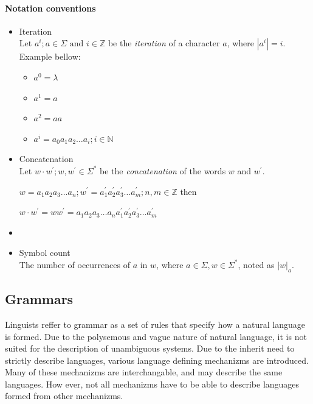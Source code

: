 \paragraph*{Notation conventions}



\begin{itemize}
\item Iteration\\
  Let $a^i; a \in \Sigma \text{ and } i \in \mathbb{Z}$ be the \emph{iteration} of a character $a$, where $|a^i| = i$.\\
Example bellow:


\begin{itemize}
\item $a^0 = \lambda$
\item $a^1 = a$
\item $a^2 = aa$
\item $a^i = a_0 a_1 a_2 \dots a_i; i \in \mathbb{N}$
\end{itemize}



\item Concatenation\\
  Let $w \cdot w^{'}; w, w^{'} \in \Sigma^{*}$ be the \emph{concatenation} of the words $w$ and $w^{'}$.

$w = a_1 a_2 a_3 \dots a_n ; w^{'} = a^{'}_1 a^{'}_2 a^{'}_3 \dots a^{'}_m; n,m \in \mathbb{Z}$ then  

$w\cdot w^{'} = w w^{'} = a_1 a_2 a_3 \dots a_n a^{'}_1 a^{'}_2 a^{'}_3 \dots a^{'}_m$


\item {}
\item Symbol count\\
The number of occurrences of $a$ in $w$, where $a \in \Sigma, w \in \Sigma^{*}$, noted as $|w|_{a}$.

\end{itemize}

\subsection{Grammars}
Linguists reffer to grammar as a set of rules that specify how a natural language is formed. Due to the polysemous and vague nature of natural language, it is not suited for the description of unambiguous systems. Due to the inherit need to strictly describe languages, various language defining mechanizms are introduced. Many of these mechanizms are interchangable, and may describe the same languages. How ever, not all mechanizms have to be able to describe languages formed from other mechanizms.

